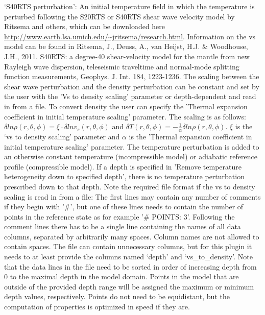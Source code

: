 \begin{itemize}
`S40RTS perturbation': An initial temperature field in which the temperature is perturbed following the S20RTS or S40RTS shear wave velocity model by Ritsema and others, which can be downloaded here \url{http://www.earth.lsa.umich.edu/~jritsema/research.html}. Information on the vs model can be found in Ritsema, J., Deuss, A., van Heijst, H.J. \& Woodhouse, J.H., 2011. S40RTS: a degree-40 shear-velocity model for the mantle from new Rayleigh wave dispersion, teleseismic traveltime and normal-mode splitting function measurements, Geophys. J. Int. 184, 1223-1236. The scaling between the shear wave perturbation and the density perturbation can be constant and set by the user with the 'Vs to density scaling' parameter or depth-dependent and read in from a file. To convert density the user can specify the 'Thermal expansion coefficient in initial temperature scaling' parameter. The scaling is as follows: $\delta ln \rho (r,\theta,\phi) = \xi \cdot \delta ln v_s(r,\theta, \phi)$ and $\delta T(r,\theta,\phi) = - \frac{1}{\alpha} \delta ln \rho(r,\theta,\phi)$. $\xi$ is the `vs to density scaling' parameter and $\alpha$ is the 'Thermal expansion coefficient in initial temperature scaling' parameter. The temperature perturbation is added to an otherwise constant temperature (incompressible model) or adiabatic reference profile (compressible model). If a depth is specified in 'Remove temperature heterogeneity down to specified depth', there is no temperature perturbation prescribed down to that depth.
Note the required file format if the vs to density scaling is read in from a file: The first lines may contain any number of comments if they begin with '#', but one of these lines needs to contain the number of points in the reference state as for example '# POINTS: 3'. Following the comment lines there has to be a single line containing the names of all data columns, separated by arbitrarily many spaces. Column names are not allowed to contain spaces. The file can contain unnecessary columns, but for this plugin it needs to at least provide the columns named `depth' and `vs\_to\_density'. Note that the data lines in the file need to be sorted in order of increasing depth from 0 to the maximal depth in the model domain. Points in the model that are outside of the provided depth range will be assigned the maximum or minimum depth values, respectively. Points do not need to be equidistant, but the computation of properties is optimized in speed if they are.


\end{itemize}
